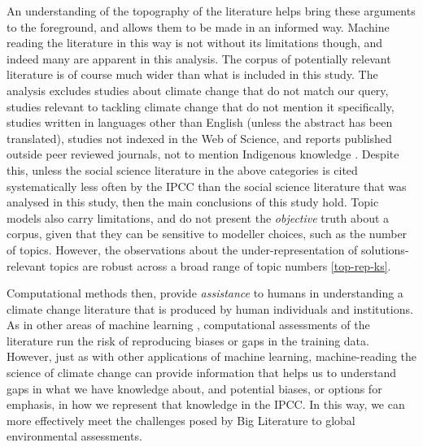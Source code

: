 \documentclass{article}
\begin{document}
\begin{linenumbers}
An understanding of the topography of the literature helps bring these arguments to the foreground, and allows them to be made in an informed way. Machine reading the literature in this way is not without its limitations though, and indeed many are apparent in this analysis. The corpus of potentially relevant literature is of course much wider than what is included in this study. The analysis excludes studies about climate change that do not match our query, studies relevant to tackling climate change that do not mention it specifically, studies written in languages other than English (unless the abstract has been translated), studies not indexed in the Web of Science, and reports published outside peer reviewed journals, not to mention Indigenous knowledge \cite{Ford2016b}. Despite this, unless the social science literature in the above categories is cited systematically less often  by the IPCC than the social science literature that was analysed in this study, then the main conclusions of this study hold. Topic models also carry limitations, and do not present the \textit{objective} truth about a corpus, given that they can be sensitive to modeller choices, such as the number of topics. However, the observations about the under-representation of solutions-relevant topics are robust across a broad range of topic numbers \ref{top-rep-ks}.

Computational methods then, provide \textit{assistance} to humans in understanding a climate change literature that is produced by human individuals and institutions.  As in other areas of machine learning \cite{Barocas2016}, computational assessments of the literature run the risk of reproducing biases or gaps in the training data. However, just as with other applications of machine learning, machine-reading the science of climate change can provide information that helps us to understand gaps in what we have knowledge about, and potential biases, or options for emphasis, in how we represent that knowledge in the IPCC. In this way, we can more effectively meet the challenges posed by Big Literature to global environmental assessments.

\end{linenumbers}

\appendix

\linespread{1}




\end{document}

